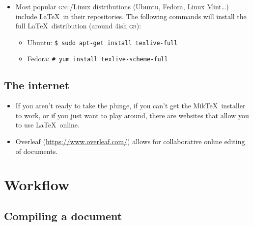 \documentclass[11pt, letterpaper]{article}
\begin{document}
    \begin{itemize}
	\item Most popular \textsc{gnu}/Linux distributions (Ubuntu, Fedora, Linux Mint\ldots) include \LaTeX\ in their repositories. The following commands will install the full \LaTeX\ distribution (around 4ish \textsc{gb}):
	
	  \begin{itemize}
	  
	    \item Ubuntu: \verb|$ sudo apt-get install texlive-full|
	    \item Fedora: \verb|# yum install texlive-scheme-full|
	  
	  \end{itemize}
	  
    \end{itemize}
      
  \subsection{The internet}\label{S:Internet}
  
    \begin{itemize}
      \item If you aren't ready to take the plunge, if you can't get the Mik\TeX\ installer to work, or if you just want to play around, there are websites that allow you to use \LaTeX\ online.
      
      \item Overleaf (\url{https://www.overleaf.com/}) allows for collaborative online editing of documents.
    \end{itemize}

      
  \section{Workflow}
  
  \subsection{Compiling a document}\label{S:Compiling}
  
\end{document}
